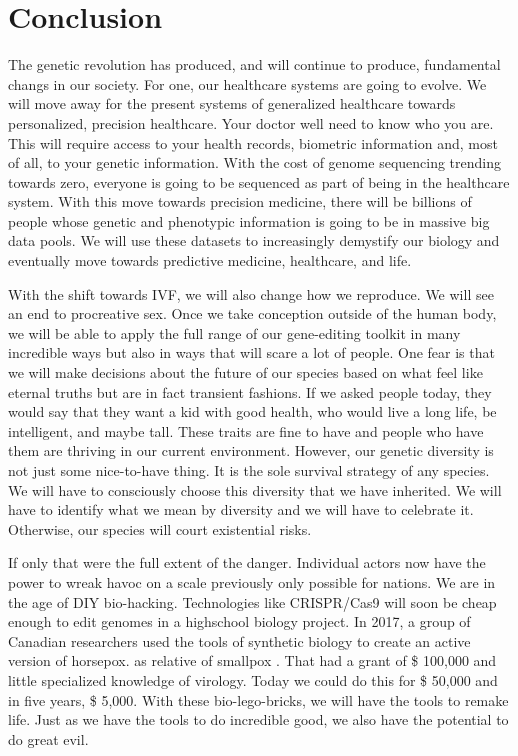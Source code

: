 \section{Conclusion}
\label{sec:conclusion}

The genetic revolution has produced, and will continue to produce, fundamental changs in our society.
For one, our healthcare systems are going to evolve.
We will move away for the present systems of generalized healthcare towards personalized, precision healthcare.
Your doctor well need to know who you are.
This will require access to your health records, biometric information and, most of all, to your genetic information.
With the cost of genome sequencing trending towards zero, everyone is going to be sequenced as part of being in the healthcare system.
With this move towards precision medicine, there will be billions of people whose genetic and phenotypic information is going to be in massive big data pools.
We will use these datasets to increasingly demystify our biology and eventually move towards predictive medicine, healthcare, and life.

With the shift towards IVF, we will also change how we reproduce.
We will see an end to procreative sex.
Once we take conception outside of the human body, we will be able to apply the full range of our gene-editing toolkit in many incredible ways but also in ways that will scare a lot of people.
One fear is that we will make decisions about the future of our species based on what feel like eternal truths but are in fact transient fashions.
If we asked people today, they would say that they want a kid with good health, who would live a long life, be intelligent, and maybe tall.
These traits are fine to have and people who have them are thriving in our current environment.
However, our genetic diversity is not just some nice-to-have thing.
It is the sole survival strategy of any species.
We will have to consciously choose this diversity that we have inherited.
We will have to identify what we mean by diversity and we will have to celebrate it.
Otherwise, our species will court existential risks.

If only that were the full extent of the danger.
Individual actors now have the power to wreak havoc on a scale previously only possible for nations.
We are in the age of DIY bio-hacking.
Technologies like CRISPR/Cas9 will soon be cheap enough to edit genomes in a highschool biology project.
In 2017, a group of Canadian researchers used the tools of synthetic biology to create an active version of horsepox. as relative of smallpox \cite{Kupferschmidt2017}.
That had a grant of \$ 100,000 and little specialized knowledge of virology.
Today we could do this for \$ 50,000 and in five years, \$ 5,000.
With these bio-lego-bricks, we will have the tools to remake life.
Just as we have the tools to do incredible good, we also have the potential to do great evil.

